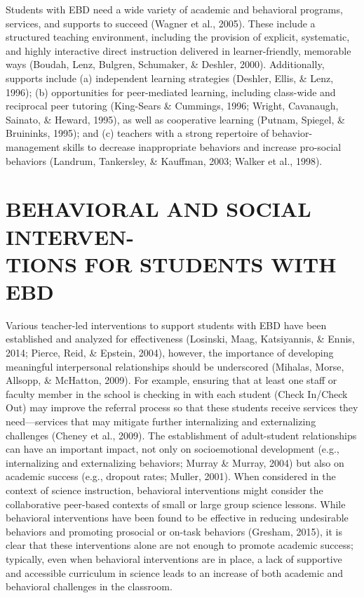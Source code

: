 \documentclass[11.5pt]{sig-alternate} %
\begin{document}
\begin{large}
 Students with EBD need a wide variety of academic and behavioral programs, services, and supports to succeed (Wagner et al., 2005). These include a structured teaching environment, including the provision of explicit, systematic, and highly interactive direct instruction delivered in learner-friendly, memorable ways (Boudah, Lenz, Bulgren, Schumaker, \& Deshler, 2000). Additionally, supports include (a) independent learning strategies (Deshler, Ellis, \& Lenz, 1996); (b) opportunities for peer-mediated learning, including class-wide and reciprocal peer tutoring (King-Sears \& Cummings, 1996; Wright, Cavanaugh, Sainato, \& Heward, 1995), as well as cooperative learning (Putnam, Spiegel, \& Bruininks, 1995); and (c) teachers with a strong repertoire of behavior-management skills to decrease inappropriate behaviors and increase pro-social behaviors (Landrum, Tankersley, \& Kauffman, 2003; Walker et al., 1998). 

\section*{BEHAVIORAL AND SOCIAL INTERVEN-\\TIONS FOR STUDENTS WITH EBD}

Various teacher-led interventions to support students with EBD have been established and analyzed for effectiveness (Losinski, Maag, Katsiyannis, \& Ennis, 2014; Pierce, Reid, \& Epstein, 2004), however, the importance of developing meaningful interpersonal relationships should be underscored (Mihalas, Morse, Allsopp, \& McHatton, 2009). For example, ensuring that at least one staff or faculty member in the school is checking in with each student (Check In/Check Out) may improve the referral process so that these students receive services they need—services that may mitigate further internalizing and externalizing challenges (Cheney et al., 2009). The establishment of adult-student relationships can have an important impact, not only on socioemotional development (e.g., internalizing and externalizing behaviors; Murray \& Murray, 2004) but also on academic success (e.g., dropout rates; Muller, 2001). When considered in the context of science instruction, behavioral interventions might consider the collaborative peer-based contexts of small or large group science lessons. While behavioral interventions have been found to be effective in reducing undesirable behaviors and promoting prosocial or on-task behaviors (Gresham, 2015), it is clear that these interventions alone are not enough to promote academic success; typically, even when behavioral interventions are in place, a lack of supportive and accessible curriculum in science leads to an increase of both academic and behavioral challenges in the classroom.


\end{large}
\end{document}
